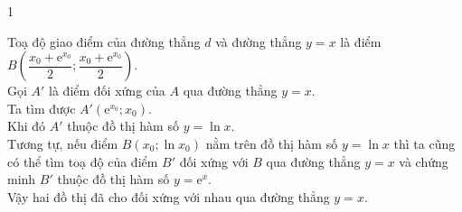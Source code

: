 \begin{bt}
{\begin{enumEX}{1}
\begin{center}
		\end{center}
		Toạ độ giao điểm của đường thẳng $d$ và đường thẳng $y=x$ là điểm $B\left(\dfrac{x_0+\mathrm{e}^{x_0}}{2}; \dfrac{x_0+\mathrm{e}^{x_0}}{2}\right).$\\
		Gọi $A'$ là điểm đối xứng của $A$ qua đường thẳng $y=x$.\\
		Ta tìm được $A'\left(\mathrm{e}^{x_0}; x_0\right)$.\\
		Khi đó $A'$ thuộc đồ thị hàm số $y=\ln x$.\\
		Tương tự, nếu điểm $B\left(x_0; \ln x_0\right)$ nằm trên đồ thị hàm số $y=\ln x$ thì ta cũng có thể tìm toạ độ của điểm $B'$ đối xứng với $B$ qua đường thẳng $y=x$ và chứng minh $B'$ thuộc đồ thị hàm số $y=\mathrm{e}^x$.\\
		Vậy hai đồ thị đã cho đối xứng với nhau qua đường thẳng $y=x$.
	\end{enumEX}	
}
\end{bt}

